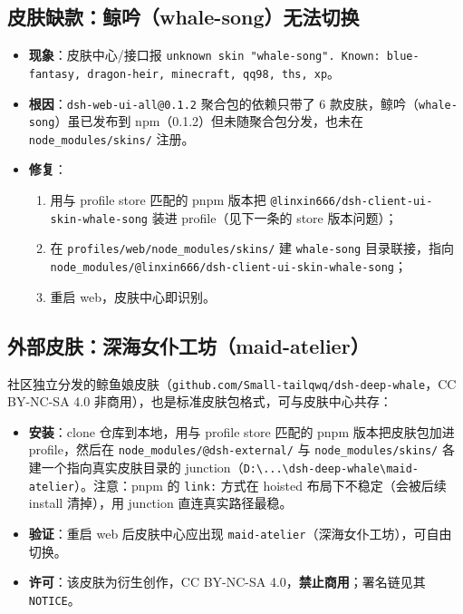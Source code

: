 \documentclass[11pt]{ctexart}
\newcommand{\code}[1]{\texttt{\small #1}}
\begin{document}
\subsection{皮肤缺款：鲸吟（whale-song）无法切换}
\label{sec:whale-song}

\begin{itemize}[itemsep=2pt]
  \item \textbf{现象}：皮肤中心/接口报 \code{unknown skin "whale-song". Known: blue-fantasy, dragon-heir, minecraft, qq98, ths, xp}。
  \item \textbf{根因}：\code{dsh-web-ui-all@0.1.2} 聚合包的依赖只带了 6 款皮肤，鲸吟（\code{whale-song}）虽已发布到 npm（0.1.2）但未随聚合包分发，也未在 \code{node\_modules/skins/} 注册。
  \item \textbf{修复}：
    \begin{enumerate}[itemsep=1pt]
      \item 用与 profile store 匹配的 pnpm 版本把 \code{@linxin666/dsh-client-ui-skin-whale-song} 装进 profile（见下一条的 store 版本问题）；
      \item 在 \code{profiles/web/node\_modules/skins/} 建 \code{whale-song} 目录联接，指向 \code{node\_modules/@linxin666/dsh-client-ui-skin-whale-song}；
      \item 重启 web，皮肤中心即识别。
    \end{enumerate}
\end{itemize}

\subsection{外部皮肤：深海女仆工坊（maid-atelier）}

社区独立分发的鲸鱼娘皮肤（\code{github.com/Small-tailqwq/dsh-deep-whale}，CC BY-NC-SA 4.0 非商用），也是标准皮肤包格式，可与皮肤中心共存：

\begin{itemize}[itemsep=2pt]
  \item \textbf{安装}：clone 仓库到本地，用与 profile store 匹配的 pnpm 版本把皮肤包加进 profile，然后在 \code{node\_modules/@dsh-external/} 与 \code{node\_modules/skins/} 各建一个指向真实皮肤目录的 junction（\code{D:\textbackslash ...\textbackslash dsh-deep-whale\textbackslash maid-atelier}）。注意：pnpm 的 \code{link:} 方式在 hoisted 布局下不稳定（会被后续 install 清掉），用 junction 直连真实路径最稳。
  \item \textbf{验证}：重启 web 后皮肤中心应出现 \code{maid-atelier}（深海女仆工坊），可自由切换。
  \item \textbf{许可}：该皮肤为衍生创作，CC BY-NC-SA 4.0，\textbf{禁止商用}；署名链见其 \code{NOTICE}。
\end{itemize}
\end{document}
